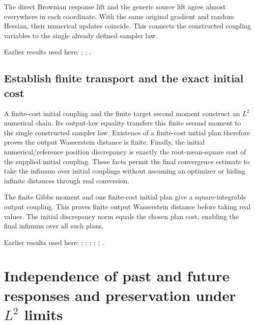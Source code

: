 \documentclass[11pt,a4paper]{report}
\begin{document}
The direct Brownian response lift and the generic source lift agree almost everywhere in each coordinate. With the same original gradient and random Hessian, their numerical updates coincide. This connects the constructed coupling variables to the single already defined sampler law.



Earlier results used here: \cite[Section~3.13.2]{LangevinLean2026ULASC}; \cite[Section~3.17.1]{LangevinLean2026ULASC}; \cite[Section~3.17.2]{LangevinLean2026ULASC}.
\subsection{\texorpdfstring{Establish finite transport and the exact initial cost}{Establish finite transport and the exact initial cost}}
\label{report-step-KineticLangevin-CanonicalKLMC2Law-lean-4}


A finite-cost initial coupling and the finite target second moment construct an \(L^{2}\) numerical chain. Its output-law equality transfers this finite second moment to the single constructed sampler law. Existence of a finite-cost initial plan therefore proves the output Wasserstein distance is finite. Finally, the initial numerical/\allowbreak{}reference position discrepancy is exactly the root-mean-square cost of the supplied initial coupling. These facts permit the final convergence estimate to take the infimum over initial couplings without assuming an optimizer or hiding infinite distances through real conversion.



The finite Gibbs moment and one finite-cost initial plan give a square-integrable output coupling. This proves finite output Wasserstein distance before taking real values. The initial discrepancy norm equals the chosen plan cost, enabling the final infimum over all such plans.



Earlier results used here: \cite[Section~3.17.1]{LangevinLean2026ULASC}; \cite[Section~3.17.2]{LangevinLean2026ULASC}; \cite[Section~3.17.3]{LangevinLean2026ULASC}; \cite[Section~3.18.2]{LangevinLean2026ULASC}; \cite[Section~3.21.2]{LangevinLean2026ULASC}; \cite[Section~3.22.23]{LangevinLean2026ULASC}.
\section{\texorpdfstring{Independence of past and future responses and preservation under \(L^{2}\) limits}{Independence of past and future responses and preservation under L² limits}}
\label{proof-module-KineticLangevin-PastFutureIndependence-lean}
\end{document}
